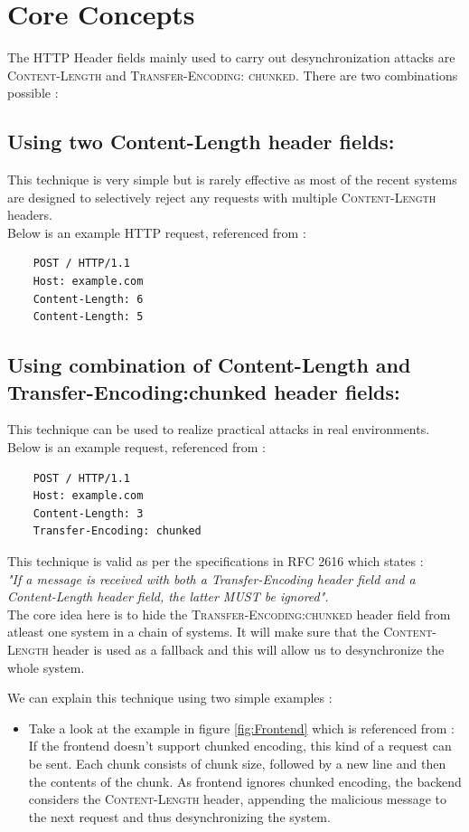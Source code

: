 \chapter{Core Concepts}
The HTTP Header fields mainly used to carry out desynchronization attacks are \textsc{Content-Length} and \textsc{Transfer-Encoding: chunked}. There are two combinations possible : 
\section{Using two Content-Length header fields:}
	This technique is very simple but is rarely effective as most of the recent systems are designed to selectively reject any requests with multiple \textsc{Content-Length} headers.\\
	Below is an example HTTP request, referenced from \cite{b6}:
	\begin{verbatim}
	POST / HTTP/1.1
	Host: example.com
	Content-Length: 6
	Content-Length: 5
	\end{verbatim}
\section{Using combination of Content-Length and Transfer-Encoding:chunked header fields:}This technique can be used to realize practical attacks in real environments. 
	Below is an example request, referenced from \cite{b6}:
	\begin{verbatim}
	POST / HTTP/1.1
	Host: example.com
	Content-Length: 3
	Transfer-Encoding: chunked
	\end{verbatim}
	This technique is valid as per the specifications in RFC 2616\cite{b10} which states : \\
	\textit{"If a message is received with both a Transfer-Encoding header field and a Content-Length header field, the latter MUST be ignored".}\\
	The core idea here is to hide the \textsc{Transfer-Encoding:chunked} header field from atleast one system in a chain of systems. It will make sure that the \textsc{Content-Length} header is used as a fallback and this will allow us to desynchronize the whole system.

We can explain this technique using two simple examples : 
\begin{itemize}
	\item Take a look at the example in figure \ref{fig:Frontend} which is referenced from \cite{b6}:
	If the frontend doesn't support chunked encoding, this kind of a request can be sent. Each chunk consists of chunk size, followed by a new line and then the contents of the chunk. As frontend ignores chunked encoding, the backend considers the \textsc{Content-Length} header, appending the malicious message to the next request and thus desynchronizing the system.
\end{itemize}

